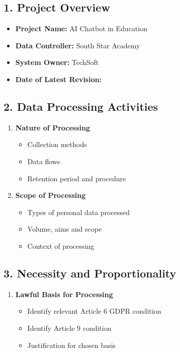 \documentclass[14pt,a4paper]{article}
\begin{document}
\begin{multicols}{2}
\subsection*{1. Project Overview}
\begin{itemize}
  \item \textbf{Project Name:} AI Chatbot in Education
    \item \textbf{Data Controller:} South Star Academy
    \item \textbf{System Owner:} TechSoft
    \item \textbf{Date of Latest Revision:}
\end{itemize}

\subsection*{2. Data Processing Activities}
\begin{enumerate}
    \item \textbf{Nature of Processing}
    \begin{itemize}
        \item Collection methods
        \item Data flows
        \item Retention period and procedure
    \end{itemize}

    \item \textbf{Scope of Processing}
    \begin{itemize}
        \item Types of personal data processed
        \item Volume, aims and scope
        \item Context of processing
    \end{itemize}
\end{enumerate}

\subsection*{3. Necessity and Proportionality}

\begin{enumerate}
  \item \textbf{Lawful Basis for Processing}

\begin{itemize}
    \item Identify relevant Article 6 GDPR condition
    \item Identify Article 9 condition
    \item Justification for chosen basis
\end{itemize}


\end{enumerate}
\end{multicols}
\end{document}
